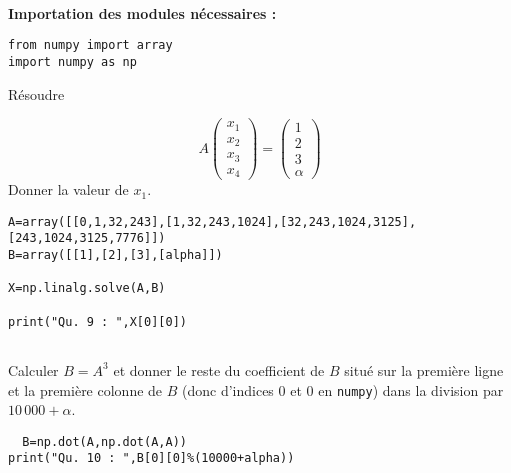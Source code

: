 \exer{[SYS-007]}
\setcounter{numques}{0}~\\

\textbf{Importation des modules nécessaires : }


\begin{lstlisting}
from numpy import array
import numpy as np
\end{lstlisting}


\question{} Résoudre

  \begin{equation*}
    A
    \begin{pmatrix}
      x_{1}\\x_{2}\\x_{3}\\x_{4}
    \end{pmatrix}
    =
    \begin{pmatrix}
      1\\ 2\\ 3\\ \alpha
    \end{pmatrix}
  \end{equation*}
  Donner la valeur de $x_{1}$.
  
  
\begin{lstlisting}
A=array([[0,1,32,243],[1,32,243,1024],[32,243,1024,3125],[243,1024,3125,7776]])
B=array([[1],[2],[3],[alpha]])

X=np.linalg.solve(A,B)

print("Qu. 9 : ",X[0][0])


\end{lstlisting}


\question{}
  Calculer $B = A^{3}$ et donner le reste du coefficient de $B$ situé
  sur la première ligne et la première colonne de $B$ (donc d'indices
  $0$ et $0$ en \texttt{numpy}) dans la division par $10\,000+\alpha$.

\begin{lstlisting}  
  B=np.dot(A,np.dot(A,A))
print("Qu. 10 : ",B[0][0]%(10000+alpha))
\end{lstlisting}
